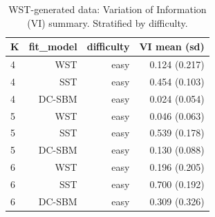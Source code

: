 \begin{table}[!h]
\centering
\caption{WST-generated data: Variation of Information (VI) summary. Stratified by difficulty.\\\label{tab:wst-appx-vi}}
\centering
\begin{tabular}[t]{lrrr}
\toprule
K & fit_model & difficulty & VI mean (sd)\\
\midrule
4 & WST & easy & 0.124 (0.217)\\
4 & SST & easy & 0.454 (0.103)\\
4 & DC-SBM & easy & 0.024 (0.054)\\
5 & WST & easy & 0.046 (0.063)\\
5 & SST & easy & 0.539 (0.178)\\
5 & DC-SBM & easy & 0.130 (0.088)\\
6 & WST & easy & 0.196 (0.205)\\
6 & SST & easy & 0.700 (0.192)\\
6 & DC-SBM & easy & 0.309 (0.326)\\
\bottomrule
\end{tabular}
\end{table}

